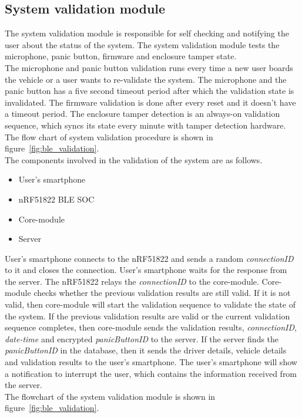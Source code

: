 \subsection{System validation module}
The system validation module is responsible for self checking and notifying the user about the status of the system. The system validation module tests the microphone, panic button, firmware and enclosure tamper state.\\
The microphone and panic button validation runs every time a new user boards the vehicle or a user wants to re-validate the system. The microphone and the panic button has a five second timeout period after which the validation state is invalidated. The firmware validation is done after every reset and it doesn't have a timeout period. The enclosure tamper detection is an always-on validation sequence, which syncs its state every minute with tamper detection hardware.\\   
The flow chart of system validation procedure is shown in figure~\ref{fig:ble_validation}. \\
The components involved in the validation of the system are as follows.
\begin{itemize}
\item User's smartphone
\item nRF51822 BLE SOC
\item Core-module
\item Server
\end{itemize}
User's smartphone connects to the nRF51822 and sends a random \emph{connectionID} to it and closes the connection. User's smartphone waits for the response from the server. The nRF51822 relays the \emph{connectionID} to the core-module. Core-module checks whether the previous validation results are still valid. If it is not valid, then core-module will start the validation sequence to validate the state of the system. If the previous validation results are valid or the current validation sequence completes, then core-module sends the validation results, \emph{connectionID}, \emph{date-time} and encrypted \emph{panicButtonID} to the server. If the server finds the \emph{panicButtonID} in the database, then it sends the driver details, vehicle details and validation results to the user's smartphone. The user's smartphone will show a notification to interrupt the user, which contains the information received from the server.\\
The flowchart of the system validation module is shown in figure~\ref{fig:ble_validation}.
